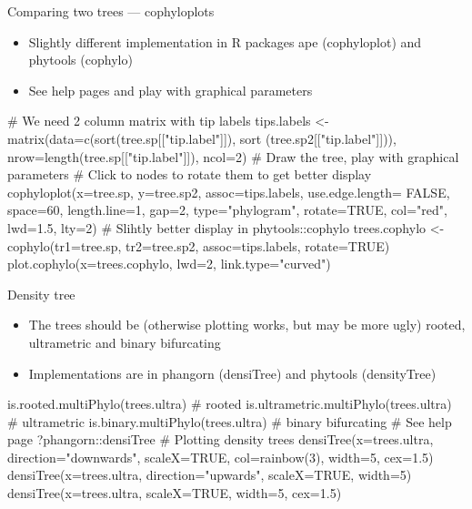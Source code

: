 \documentclass[compress, ucs, xelatex, 11pt, xcolor=x11names, aspectratio=169,
	hyperref={
		bookmarks=true,
		unicode=true,
		colorlinks=true,
		pdftitle={HybSeq course},
		plainpages=false,
		pdfauthor={Vojtech Zeisek},
		pdfsubject={Practical processing of HybSeq target enrichment sequencing data on computing grids like MetaCentrum},
		pdfcreator={XeLaTeX},
		pdfkeywords={BASH, command line, GNU, HybSeq, Linux, MetaCentrum, sequencing shell, target enrichment},
		linkcolor=Turquoise4, %
		anchorcolor=DodgerBlue4, %
		citecolor=DodgerBlue4, %
		filecolor=DodgerBlue4, %
		menucolor=Tan4, %
		urlcolor=DarkOliveGreen4, %
		pdftex},
	url={hyphens, lowtilde} %
	]{beamer}
\renewcommand{\texttt}[1]{\colorbox{Cornsilk2}{{\ttfamily #1}}}
\begin{document}
\begin{frame}[fragile]{Comparing two trees --- cophyloplots}
	\begin{itemize}
		\item Slightly different implementation in \texttt{R} packages \texttt{ape} (\texttt{cophyloplot}) and \texttt{phytools} (\texttt{cophylo})
		\item See help pages and play with graphical parameters
	\end{itemize}
	\begin{spluscode}
    # We need 2 column matrix with tip labels
    tips.labels <- matrix(data=c(sort(tree.sp[["tip.label"]]), sort
      (tree.sp2[["tip.label"]])), nrow=length(tree.sp[["tip.label"]]), ncol=2)
    # Draw the tree, play with graphical parameters
    # Click to nodes to rotate them to get better display
    cophyloplot(x=tree.sp, y=tree.sp2, assoc=tips.labels, use.edge.length=
      FALSE, space=60, length.line=1, gap=2, type="phylogram", rotate=TRUE,
      col="red", lwd=1.5, lty=2)
    # Slihtly better display in phytools::cophylo
    trees.cophylo <- cophylo(tr1=tree.sp, tr2=tree.sp2, assoc=tips.labels,
      rotate=TRUE)
    plot.cophylo(x=trees.cophylo, lwd=2, link.type="curved")
	\end{spluscode}
\end{frame}

\begin{frame}[fragile]{Density tree}
	\begin{itemize}
		\item The trees should be (otherwise plotting works, but may be more ugly) rooted, ultrametric and binary bifurcating
		\item Implementations are in \texttt{phangorn} (\texttt{densiTree}) and \texttt{phytools} (\texttt{densityTree})
	\end{itemize}
	\begin{spluscode}
    is.rooted.multiPhylo(trees.ultra) # rooted
    is.ultrametric.multiPhylo(trees.ultra) # ultrametric
    is.binary.multiPhylo(trees.ultra) # binary bifurcating
    # See help page
    ?phangorn::densiTree
    # Plotting density trees
    densiTree(x=trees.ultra, direction="downwards", scaleX=TRUE,
      col=rainbow(3), width=5, cex=1.5)
    densiTree(x=trees.ultra, direction="upwards", scaleX=TRUE, width=5)
    densiTree(x=trees.ultra, scaleX=TRUE, width=5, cex=1.5)
	\end{spluscode}
\end{frame}
\end{document}
